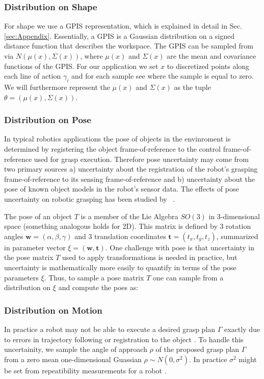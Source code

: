 \documentclass[letterpaper, 10 pt, conference]{ieeeconf}  %
\newcommand{\bw}{\mathbf{w}}
\newcommand{\bt}{\mathbf{t}}
\begin{document}
\subsubsection{Distribution on Shape}

For shape we use a GPIS representation, which is explained in detail in Sec. \ref{sec:Appendix}. Essentially, a GPIS is a Gaussian distribution on a signed distance function that describes the workspace. The GPIS can be sampled from via $N(\mu(x),\Sigma(x))$, where $\mu(x)$ and $\Sigma(x)$ are the mean and covariance functions of the GPIS. For our application we set $x$ to discretized points along each line of action $\gamma_i$ and for each sample see where the sample is equal to zero.  We will furthermore represent the $\mu(x)$ and $\Sigma(x)$ as the tuple $\theta = \left( \mu(x), \Sigma(x) \right)$. 

\subsubsection{Distribution on Pose}
In typical robotics applications the pose of objects in the envinroment is determined by registering the object frame-of-reference to the control frame-of-reference used for grasp execution.
Therefore pose uncertainty may come from two primary sources a) uncertainty about the registration of the robot's grasping frame-of-reference to its sensing frame-of-reference and b) uncertainty about the pose of known object models in the robot's sensor data.
The effects of pose uncertainty on robotic grasping has been studied by ~\cite{}.

The pose of an object $T$ is a member of the Lie Algebra $SO(3)$ in 3-dimensional space (something analogous holds for 2D).
This matrix is defined by 3 rotation angles $\bw = (\alpha, \beta, \gamma)$ and 3 translation coordinates $\bt = (t_x, t_y, t_z)$, summarized in parameter vector $\xi = (\bw, \bt)$.
One challenge with pose is that uncertainty in the pose matrix $T$ used to apply transformations is needed in practice, but uncertainty is mathematically more easily to quantify in terms of the pose parameters $\xi$.
Thus, to sample a pose matrix $T$ one can sample from a distribution on $\xi$ and compute the poes as:

 
 \subsubsection{Distribution on Motion}
 In practice a robot may not be able to execute a desired
grasp plan $\Gamma$ exactly due to errors in trajectory following or
registration to the object \cite{kehoe2012estimating}. To handle this uncertainity, we sample the angle of approach $\rho$ of the proposed grasp plan $\Gamma$ from a zero mean one-dimensional Guassian $\rho \sim N(0,\sigma^2)$. In practice $\sigma^2$ might be set from repeatibility measurements for a robot \cite{mooring1986determination}.
\end{document}
